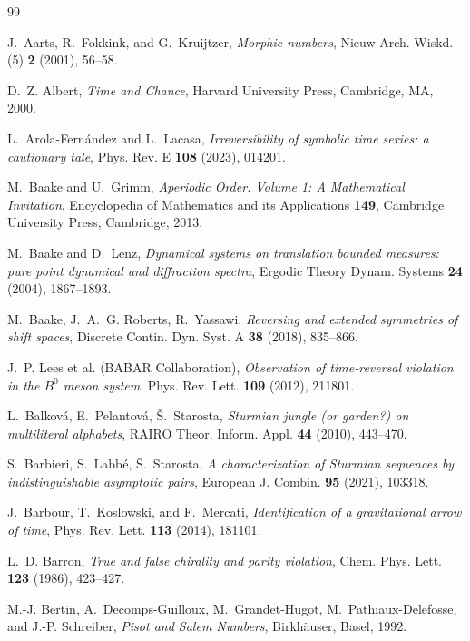 \documentclass[11pt]{amsart}
\theoremstyle{plain}
\theoremstyle{definition}
\theoremstyle{remark}
\begin{document}
\begin{thebibliography}{99}

J.~Aarts, R.~Fokkink, and G.~Kruijtzer,
\emph{Morphic numbers},
Nieuw Arch. Wiskd. (5) \textbf{2} (2001), 56--58.

D.~Z. Albert, \emph{Time and Chance}, Harvard University Press, Cambridge, MA, 2000.

L.~Arola-Fern\'andez and L.~Lacasa,
\emph{Irreversibility of symbolic time series: a cautionary tale},
Phys. Rev. E \textbf{108} (2023), 014201.

M.~Baake and U.~Grimm,
\emph{Aperiodic Order. Volume 1: A Mathematical Invitation},
Encyclopedia of Mathematics and its Applications \textbf{149},
Cambridge University Press, Cambridge, 2013.

M.~Baake and D.~Lenz,
\emph{Dynamical systems on translation bounded measures: pure point dynamical and diffraction
spectra},
Ergodic Theory Dynam. Systems \textbf{24} (2004), 1867--1893.

M.~Baake, J.~A.~G. Roberts, R.~Yassawi,
\emph{Reversing and extended symmetries of shift spaces},
Discrete Contin. Dyn. Syst. A \textbf{38} (2018), 835--866.

J.~P. Lees et al. (BABAR Collaboration),
\emph{Observation of time-reversal violation in the $B^0$ meson system},
Phys. Rev. Lett. \textbf{109} (2012), 211801.

L.~Balkov\'a, E.~Pelantov\'a, \v{S}.~Starosta,
\emph{Sturmian jungle (or garden?) on multiliteral alphabets},
RAIRO Theor. Inform. Appl. \textbf{44} (2010), 443--470.

S.~Barbieri, S.~Labb\'e, \v{S}.~Starosta,
\emph{A characterization of Sturmian sequences by indistinguishable asymptotic pairs},
European J. Combin. \textbf{95} (2021), 103318.

J.~Barbour, T.~Koslowski, and F.~Mercati,
\emph{Identification of a gravitational arrow of time},
Phys. Rev. Lett. \textbf{113} (2014), 181101.

L.~D. Barron,
\emph{True and false chirality and parity violation},
Chem. Phys. Lett. \textbf{123} (1986), 423--427.

M.-J. Bertin, A.~Decomps-Guilloux, M.~Grandet-Hugot,
M.~Pathiaux-Delefosse, and J.-P. Schreiber,
\emph{Pisot and Salem Numbers},
Birkh\"auser, Basel, 1992.


\end{thebibliography}
\end{document}
